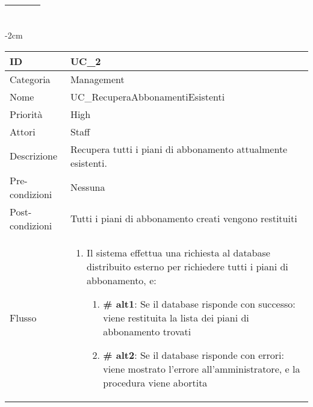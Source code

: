 \begin{center}
\begin{table}[bp]
\begin{tabular}{ |p{2.6cm}|p{13cm}|  }
\begin{enumerate}
			\end{enumerate}\\\hline
\end{tabular}
\label{table_use_case:1}\newline
\end{table}

\begin{table}[bp]
    \centering
    \addtolength{\leftskip} {-2cm}
\begin{tabular}{ |p{2.6cm}|p{13cm}|  }
\hline
ID & UC\_2 \\\hline
Categoria & Management\\\hline
Nome & UC\_RecuperaAbbonamentiEsistenti\\\hline
Priorità & High \\\hline
Attori &  Staff \\\hline
Descrizione & Recupera tutti i piani di abbonamento attualmente esistenti.\\\hline
Pre-condizioni &  Nessuna \\\hline
Post-condizioni &  Tutti i piani di abbonamento creati vengono restituiti\\\hline
Flusso &  	\begin{enumerate}
			\item Il sistema effettua una richiesta al database distribuito esterno per richiedere tutti i piani di abbonamento, e:
				\begin{enumerate}[  ]
				\item \textbf{\# alt1}: Se il database risponde con successo: viene restituita la lista dei piani di abbonamento trovati
				\item \textbf{\# alt2}: Se il database risponde con errori: viene mostrato l'errore all'amministratore, e la procedura viene abortita
				\end{enumerate}
		\end{enumerate}\\\hline
\end{tabular}
\label{table_use_case:2}\newline
\end{table}


\end{center}
